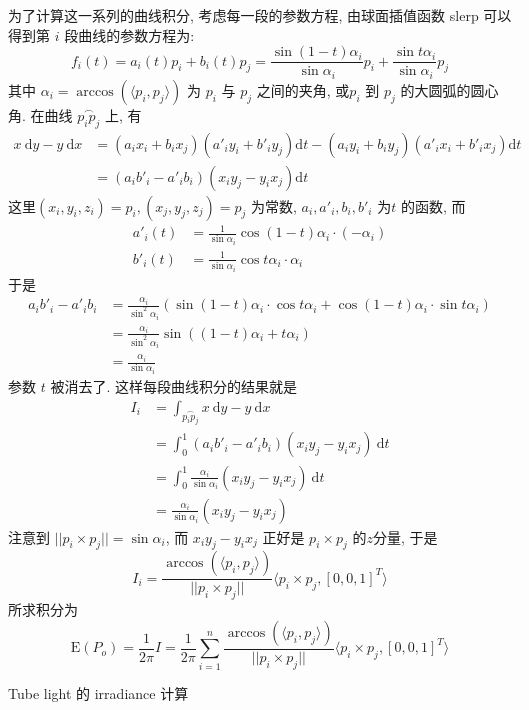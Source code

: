 为了计算这一系列的曲线积分, 考虑每一段的参数方程, 由球面插值函数 slerp 可以得到第 $i$ 段曲线的参数方程为:
\[
f_i(t) = a_i(t) p_i + b_i(t) p_j = \frac{\sin (1-t)\alpha_i}{\sin\alpha_i} p_i + \frac{\sin t\alpha_i}{\sin\alpha_i} p_j
\]
其中 $\alpha_i = \arccos(\langle p_i,p_j \rangle)$ 为 $p_i$ 与 $p_j$ 之间的夹角, 或$p_i$ 到 $p_j$ 的大圆弧的圆心角. 在曲线 $\overset{\frown}{p_ip_j}$ 上, 有
\begin{align*}
x\ \mathrm{d}y - y\ \mathrm{d}x &= (a_ix_i+b_ix_j)(a'_iy_i+b'_iy_j)\mathrm{d}t - (a_iy_i+b_iy_j)(a'_ix_i+b'_ix_j)\mathrm{d}t\\
&= (a_ib'_i - a'_ib_i)(x_iy_j - y_ix_j)\mathrm{d}t
\end{align*}
这里$(x_i,y_i,z_i)=p_i, (x_j,y_j,z_j)=p_j$ 为常数, $a_i, a'_i, b_i, b'_i$ 为$t$ 的函数, 而
\begin{align*}
a'_i(t) &= \frac{1}{\sin\alpha_i}\cos(1-t)\alpha_i\cdot(-\alpha_i) \\
b'_i(t) &= \frac{1}{\sin\alpha_i}\cos t\alpha_i \cdot \alpha_i
\end{align*}
于是
\begin{align*}
a_ib'_i - a'_ib_i &= \frac{\alpha_i}{\sin^2\alpha_i}\left(\sin(1-t)\alpha_i\cdot\cos t\alpha_i + \cos(1-t)\alpha_i\cdot\sin t\alpha_i\right)\\
&= \frac{\alpha_i}{\sin^2\alpha_i}\sin((1-t)\alpha_i + t\alpha_i)\\
&= \frac{\alpha_i}{\sin\alpha_i}
\end{align*}
参数 $t$ 被消去了. 这样每段曲线积分的结果就是
\begin{align*}
I_i &= \int_{\overset{\frown}{p_ip_j}} x\ \mathrm{d}y - y\ \mathrm{d}x \\
&= \int_0^1(a_ib'_i - a'_ib_i)(x_iy_j - y_ix_j)\ \mathrm{d}t \\
&= \int_0^1 \frac{\alpha_i}{\sin\alpha_i}(x_iy_j - y_ix_j)\ \mathrm{d}t\\
 &= \frac{\alpha_i}{\sin\alpha_i}(x_iy_j - y_ix_j)
\end{align*}
注意到 $||p_i\times p_j|| = \sin\alpha_i$, 而 $x_iy_j - y_ix_j$ 正好是 $p_i\times p_j$ 的$z$分量, 于是
\[
I_i = \frac{\arccos(\langle p_i,p_j \rangle)}{||p_i\times p_j||}\langle p_i\times p_j,[0,0,1]^T \rangle
\]
所求积分为 
\[
\mathrm{E}(P_o) = \frac{1}{2\pi}I = \frac{1}{2\pi}\sum_{i=1}^n \frac{\arccos(\langle p_i,p_j \rangle)}{||p_i\times p_j||}\langle p_i\times p_j,[0,0,1]^T \rangle
\]

\newpage
\noindent Tube light 的 irradiance 计算

